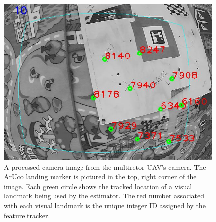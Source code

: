 \begin{figure}
  \centering
  \includegraphics[scale=0.5]{imgs/features_with_aruco.png}
  \caption{A processed camera image from the multirotor UAV's camera. The ArUco
  landing marker is pictured in the top, right corner of the image. Each green
circle shows the tracked location of a visual landmark being used by the
estimator. The red number associated with each visual landmark is the unique
integer ID assigned by the feature tracker.}
  \label{fig:features_with_aruco}
\end{figure}
